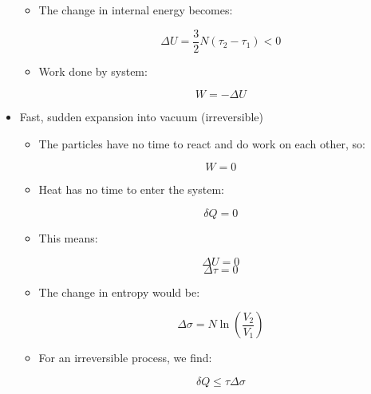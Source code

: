 \begin{itemize}
\begin{itemize}
      \item The change in internal energy becomes:

        $$\Delta U=\frac{3}{2}N(\tau_2-\tau_1)<0$$

      \item Work done by system:

        $$W=-\Delta U$$

    \end{itemize}

  \item Fast, sudden expansion into vacuum (irreversible)

    \begin{itemize}

      \item The particles have no time to react and do work on each other, so:

        $$W=0$$

      \item Heat has no time to enter the system:

        $$\delta Q=0$$

      \item This means:

        $$\Delta U=0$$
        $$\Delta \tau=0$$

      \item The change in entropy would be:

        $$\Delta \sigma=N\ln\left( \frac{V_2}{V_1} \right)$$

      \item For an irreversible process, we find:

        $$\delta Q\leq\tau\Delta\sigma$$

    \end{itemize}

\end{itemize}





